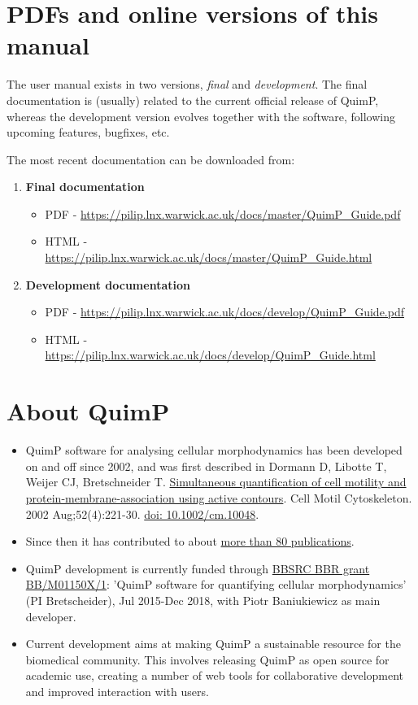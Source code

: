 \documentclass[a4paper,12pt]{article}
\begin{document}
\section{PDFs and online versions of this manual}
The user manual exists in two versions, \textit{final} and \textit{development}. The final documentation is (usually) related to the current official release of QuimP, whereas the development version evolves together with the software, following upcoming features, bugfixes, etc.

The most recent documentation can be downloaded from:
\begin{enumerate}
	\item \textbf{Final documentation}
	\begin{itemize}
		\item PDF - \url{https://pilip.lnx.warwick.ac.uk/docs/master/QuimP_Guide.pdf}
		\item HTML - \url{https://pilip.lnx.warwick.ac.uk/docs/master/QuimP_Guide.html}
	\end{itemize}
	\item \textbf{Development documentation}
	\begin{itemize}
		\item PDF - \url{https://pilip.lnx.warwick.ac.uk/docs/develop/QuimP_Guide.pdf}
		\item HTML - \url{https://pilip.lnx.warwick.ac.uk/docs/develop/QuimP_Guide.html}
	\end{itemize}
\end{enumerate} 

\section{About QuimP}
	\begin{itemize}
	\item QuimP software for analysing cellular morphodynamics has been developed on and off since 2002, and was first described in
Dormann D, Libotte T, Weijer CJ, Bretschneider T. \href{https://www.ncbi.nlm.nih.gov/pubmed/12112136}{Simultaneous quantification of cell motility and protein-membrane-association using active contours}. Cell Motil Cytoskeleton. 2002 Aug;52(4):221-30. \href{http://dx.doi.org/10.1007/978-3-0348-8043-5_17}{doi: 10.1002/cm.10048}.
	\item Since then it has contributed to about \href{http://www.warwick.ac.uk/quimp/quimp-refs}{more than 80 publications}.
	\item QuimP development is currently funded through \href{http://www.bbsrc.ac.uk/research/grants-search/AwardDetails/?FundingReference=BB/M01150X/1}{BBSRC BBR grant BB/M01150X/1}: 'QuimP software for quantifying cellular morphodynamics' (PI Bretscheider), Jul 2015-Dec 2018, with Piotr Baniukiewicz as main developer.
	\item Current development aims at making QuimP a sustainable resource for the biomedical community. This involves releasing QuimP as open source for academic use, creating a number of web tools for collaborative development and improved interaction with users.
	\end{itemize}
\end{document}
